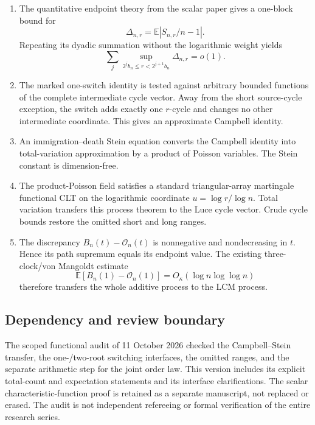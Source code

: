 \documentclass[11pt]{article}
\theoremstyle{definition}
\theoremstyle{remark}
\newcommand{\Ee}{\mathbb E}
\newcommand{\cO}{\mathcal O}
\begin{document}
\begin{enumerate}[label=\textnormal{(\roman*)},leftmargin=2.4em]
\item The quantitative endpoint theory from the scalar paper gives a
one-block bound for
\[
 \Delta_{n,r}=\Ee\left|S_{n,r}/n-1\right|.
\]
Repeating its dyadic summation without the logarithmic weight yields
\[
 \sum_j\sup_{2^jb_n\le r<2^{j+1}b_n}\Delta_{n,r}=o(1).
\]

\item The marked one-switch identity is tested against arbitrary bounded
functions of the complete intermediate cycle vector.  Away from the short
source-cycle exception, the switch adds exactly one $r$-cycle and changes no
other intermediate coordinate.  This gives an approximate Campbell identity.

\item An immigration--death Stein equation converts the Campbell identity
into total-variation approximation by a product of Poisson variables.  The
Stein constant is dimension-free.

\item The product-Poisson field satisfies a standard triangular-array
martingale functional CLT on the logarithmic coordinate
$u=\log r/\log n$.  Total variation transfers this process theorem to the
Luce cycle vector.  Crude cycle bounds restore the omitted short and long
ranges.

\item The discrepancy $B_n(t)-\cO_n(t)$ is nonnegative and nondecreasing in
$t$.  Hence its path supremum equals its endpoint value.  The existing
three-clock/von Mangoldt estimate
\[
 \Ee[B_n(1)-\cO_n(1)]=O_\kappa(\log n\log\log n)
\]
therefore transfers the whole additive process to the LCM process.
\end{enumerate}

\subsection*{Dependency and review boundary}

The scoped functional audit of 11 October 2026 checked the Campbell--Stein
transfer, the one-/two-root switching interfaces, the omitted ranges, and
the separate arithmetic step for the joint order law. This version includes
its explicit total-count and expectation statements and its interface
clarifications. The scalar characteristic-function proof is retained as a
separate manuscript, not replaced or erased. The audit is not independent
refereeing or formal verification of the entire research series.
\end{document}
